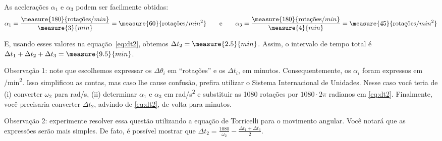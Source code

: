 \begin{question}
\begin{solution}
        As acelerações $\alpha_1$ e $\alpha_3$ podem ser facilmente obtidas:
        \begin{equation*}
            \alpha_1 = \frac{\measure{180}{\text{rotações}/min}}{\measure{3}{min}} = \measure{60}{\text{rotações}/min^2}
            \qquad\text{e}\qquad
            \alpha_3 = \frac{\measure{180}{\text{rotações}/min}}{\measure{4}{min}} = \measure{45}{\text{rotações}/min^2}
        \end{equation*}

        E, usando esses valores na equação~\eqref{eq:dt2}, obtemos $\Delta t_2 = \measure{2.5}{min}$.
        Assim, o intervalo de tempo total é $\Delta t_1 + \Delta t_2 + \Delta t_3 = \measure{9.5}{min}$.

        \begin{compactdesc}
            \item[Observação 1:] note que escolhemos expressar os $\Delta\theta_i$ em ``rotações'' e os $\Delta t_i$, em minutos.
            Consequentemente, os $\alpha_i$ foram expressos em \unit{/min^2}.
            Isso simplificou as contas, mas caso lhe cause confusão, prefira utilizar o Sistema Internacional de Unidades.
            Nesse caso você teria de (i) converter $\omega_2$ para \unit{rad/s}, (ii) determinar $\alpha_1$ e $\alpha_3$ em \unit{rad/s^2} e substituir as 1080 rotações por $1080\cdot 2\pi$ radianos em \eqref{eq:dt2}.
            Finalmente, você precisaria converter $\Delta t_2$, advindo de \eqref{eq:dt2}, de volta para minutos.
            \item[Observação 2:] experimente resolver essa questão utilizando a equação de Torricelli para o movimento angular.
            Você notará que as expressões serão mais simples.
            De fato, é possível mostrar que $\Delta t_2 = \frac{1080}{\omega_2} - \frac{\Delta t_1 + \Delta t_3}{2}$.
        \end{compactdesc}
    \end{solution}
\end{question}